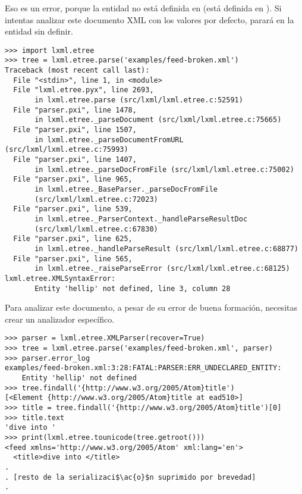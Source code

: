 Eso es un error, porque la entidad  no está definida en  (está definida en ). Si intentas analizar este documento XML con los valores por defecto,  parará en la entidad sin definir.

\noindent\begin{minipage}{\textwidth}
\begin{lstlisting}[mathescape=True]
>>> import lxml.etree
>>> tree = lxml.etree.parse('examples/feed-broken.xml')
Traceback (most recent call last):
  File "<stdin>", line 1, in <module>
  File "lxml.etree.pyx", line 2693, 
       in lxml.etree.parse (src/lxml/lxml.etree.c:52591)
  File "parser.pxi", line 1478, 
       in lxml.etree._parseDocument (src/lxml/lxml.etree.c:75665)
  File "parser.pxi", line 1507, 
       in lxml.etree._parseDocumentFromURL (src/lxml/lxml.etree.c:75993)
  File "parser.pxi", line 1407, 
       in lxml.etree._parseDocFromFile (src/lxml/lxml.etree.c:75002)
  File "parser.pxi", line 965, 
       in lxml.etree._BaseParser._parseDocFromFile 
       (src/lxml/lxml.etree.c:72023)
  File "parser.pxi", line 539, 
       in lxml.etree._ParserContext._handleParseResultDoc 
       (src/lxml/lxml.etree.c:67830)
  File "parser.pxi", line 625, 
       in lxml.etree._handleParseResult (src/lxml/lxml.etree.c:68877)
  File "parser.pxi", line 565, 
       in lxml.etree._raiseParseError (src/lxml/lxml.etree.c:68125)
lxml.etree.XMLSyntaxError: 
       Entity 'hellip' not defined, line 3, column 28
\end{lstlisting}
\end{minipage}

Para analizar este documento, a pesar de su error de buena formación, necesitas crear un analizador  específico.

\noindent\begin{minipage}{\textwidth}
\begin{lstlisting}[mathescape=True]
>>> parser = lxml.etree.XMLParser(recover=True)
>>> tree = lxml.etree.parse('examples/feed-broken.xml', parser)
>>> parser.error_log 
examples/feed-broken.xml:3:28:FATAL:PARSER:ERR_UNDECLARED_ENTITY: 
    Entity 'hellip' not defined
>>> tree.findall('{http://www.w3.org/2005/Atom}title')
[<Element {http://www.w3.org/2005/Atom}title at ead510>]
>>> title = tree.findall('{http://www.w3.org/2005/Atom}title')[0]
>>> title.text
'dive into '
>>> print(lxml.etree.tounicode(tree.getroot()))
<feed xmlns='http://www.w3.org/2005/Atom' xml:lang='en'>
  <title>dive into </title>
.
. [resto de la serializaci$\ac{o}$n suprimido por brevedad]
.

\end{lstlisting}
\end{minipage}


